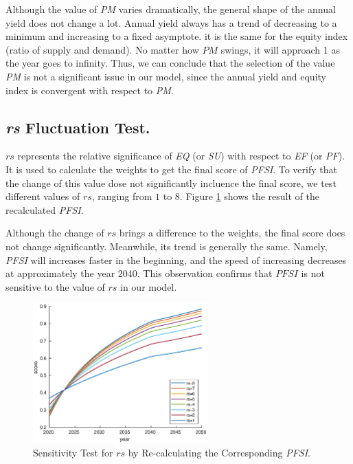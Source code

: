 \documentclass[12pt]{article}
\begin{document}
Although the value of \textit{PM} varies dramatically, the general shape of the annual yield does not change a lot. Annual yield always has a trend of decreasing to a minimum and increasing to a fixed asymptote. it is the same for the equity index (ratio of supply and demand). No matter how $PM$ swings, it will approach 1 as the year goes to infinity. Thus, we can conclude that the selection of the value \textit{PM} is not a significant issue in our model, since the annual yield and equity index is convergent with respect to \textit{PM}.

\subsection{\textbf{\textit{rs}} Fluctuation Test.}
$rs$ represents the relative significance of \textit{EQ} (or \textit{SU}) with respect to \textit{EF} (or \textit{PF}). It is used to calculate the weights to get the final score of \textit{PFSI}. To verify that the change of this value dose not significantly incluence the final score, we test different values of $rs$, ranging from $1$ to $8$. Figure \ref{fig:sense_rs} shows the result of the recalculated \textit{PFSI}. 

Although the change of $rs$ brings a difference to the weights, the final score does not change significantly. Meanwhile, its trend is generally the same. Namely, \textit{PFSI} will increases faster in the beginning, and the speed of increasing decreases at approximately the year 2040. This observation confirms that $PFSI$ is not sensitive to the value of $rs$ in our model.
\begin{figure}[h]
    \centering
    \includegraphics[width = 0.6\textwidth]{figure/sense/sense_AHP.eps}
    \caption{Sensitivity Test for $rs$ by Re-calculating the Corresponding \textit{PFSI}.\label{fig:sense_rs}}
\end{figure}
\end{document}
